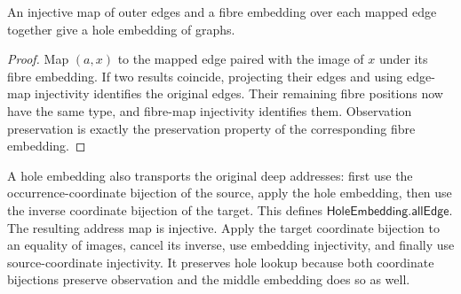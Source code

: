 \begin{lemma}
An injective map of outer edges and a fibre embedding over each mapped edge
together give a hole embedding of graphs.
\end{lemma}
\begin{proof}
Map $(a,x)$ to the mapped edge paired with the image of $x$ under its fibre
embedding. If two results coincide, projecting their edges and using edge-map
injectivity identifies the original edges. Their remaining fibre positions now
have the same type, and fibre-map injectivity identifies them. Observation
preservation is exactly the preservation property of the corresponding fibre
embedding.
\end{proof}

A hole embedding also transports the original deep addresses: first use the
occurrence-coordinate bijection of the source, apply the hole embedding, then
use the inverse coordinate bijection of the target. This defines
$\mathsf{HoleEmbedding.allEdge}$.
The resulting address map is injective. Apply the target coordinate bijection
to an equality of images, cancel its inverse, use embedding injectivity, and
finally use source-coordinate injectivity. It preserves hole lookup because
both coordinate bijections preserve observation and the middle embedding does
so as well.

